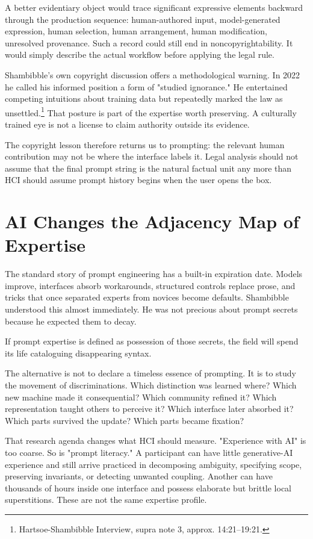 \documentclass[11pt]{article}
\begin{document}
A better evidentiary object would trace significant expressive elements backward through the production sequence: human-authored input, model-generated expression, human selection, human arrangement, human modification, unresolved provenance. Such a record could still end in noncopyrightability. It would simply describe the actual workflow before applying the legal rule.

Shambibble's own copyright discussion offers a methodological warning. In 2022 he called his informed position a form of "studied ignorance." He entertained competing intuitions about training data but repeatedly marked the law as unsettled.\footnote{Hartsoe-Shambibble Interview, supra note 3, approx. 14:21--19:21.} That posture is part of the expertise worth preserving. A culturally trained eye is not a license to claim authority outside its evidence.

The copyright lesson therefore returns us to prompting: the relevant human contribution may not be where the interface labels it. Legal analysis should not assume that the final prompt string is the natural factual unit any more than HCI should assume prompt history begins when the user opens the box.

\section{AI Changes the Adjacency Map of Expertise}

The standard story of prompt engineering has a built-in expiration date. Models improve, interfaces absorb workarounds, structured controls replace prose, and tricks that once separated experts from novices become defaults. Shambibble understood this almost immediately. He was not precious about prompt secrets because he expected them to decay.

If prompt expertise is defined as possession of those secrets, the field will spend its life cataloguing disappearing syntax.

The alternative is not to declare a timeless essence of prompting. It is to study the movement of discriminations. Which distinction was learned where? Which new machine made it consequential? Which community refined it? Which representation taught others to perceive it? Which interface later absorbed it? Which parts survived the update? Which parts became fixation?

That research agenda changes what HCI should measure. "Experience with AI" is too coarse. So is "prompt literacy." A participant can have little generative-AI experience and still arrive practiced in decomposing ambiguity, specifying scope, preserving invariants, or detecting unwanted coupling. Another can have thousands of hours inside one interface and possess elaborate but brittle local superstitions. These are not the same expertise profile.
\end{document}
